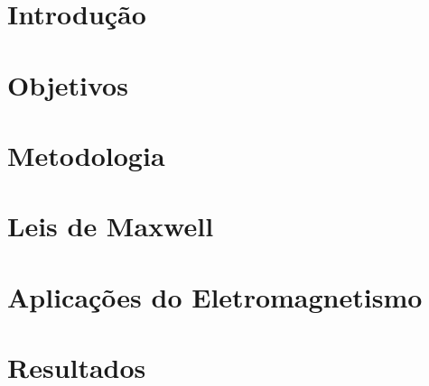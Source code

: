 \documentclass[a4paper, 12pt]{article}
\begin{document}
    \newpage
    \listoffigures
    \setcounter{page}{1}
    
    \newpage
    \listoftables
    
    \newpage
    \tableofcontents
    \thispagestyle{empty}
    
    \newpage
    
    \setcounter{page}{1}
    
    \newpage
    \section{Introdução}
    
    
    \section{Objetivos}
    
    
    \section{Metodologia}
    
    
    \section{Leis de Maxwell}
    
    
    \section{Aplicações do Eletromagnetismo}
    
    
    \section{Resultados}
    
    
    \nocite{thornton2004classical}
    \nocite{johntaylor2005}
    \nocite{eisberg1979fisica}
    \nocite{griffiths2017introduction}
    \nocite{ness1983understanding}
    
    \newpage
    
    
    
\end{document}
